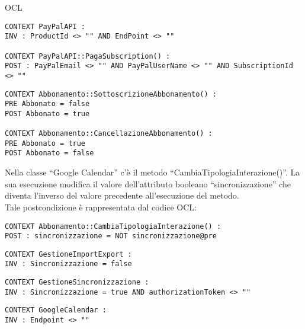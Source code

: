 \begin{listaPersonale}{OCL}
    \begin{lstlisting}
CONTEXT PayPalAPI :
INV : ProductId <> "" AND EndPoint <> ""

CONTEXT PayPalAPI::PagaSubscription() :
POST : PayPalEmail <> "" AND PayPalUserName <> "" AND SubscriptionId <> ""
    \end{lstlisting}




    \begin{lstlisting}
CONTEXT Abbonamento::SottoscrizioneAbbonamento() :
PRE Abbonato = false
POST Abbonato = true

CONTEXT Abbonamento::CancellazioneAbbonamento() :
PRE Abbonato = true
POST Abbonato = false
    \end{lstlisting}




    Nella classe “Google Calendar” c'è il metodo “CambiaTipologiaInterazione()”. La sua esecuzione modifica il valore dell'attributo booleano “sincronizzazione” che diventa l'inverso del valore precedente all'esecuzione del metodo.\\
    Tale postcondizione è rappresentata dal codice OCL:
    \begin{lstlisting}
CONTEXT Abbonamento::CambiaTipologiaInterazione() :
POST : sincronizzazione = NOT sincronizzazione@pre 
    \end{lstlisting}




    \begin{lstlisting}
CONTEXT GestioneImportExport :
INV : Sincronizzazione = false
    \end{lstlisting}




    \begin{lstlisting}
CONTEXT GestioneSincronizzazione :
INV : Sincronizzazione = true AND authorizationToken <> ""
    \end{lstlisting}




    \begin{lstlisting}
CONTEXT GoogleCalendar :
INV : Endpoint <> ""
    \end{lstlisting}





\end{listaPersonale}
